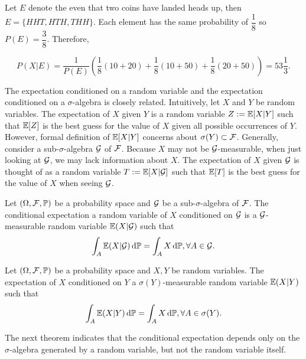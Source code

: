 \begin{solution}
 Let $E$ denote the even that two coins have landed heads up, then $E=\{HHT, HTH, THH\}$. Each element has the same probability of $\dfrac{1}{8}$ so $P(E)=\dfrac{3}{8}$. Therefore,

 $$P(X|E)=\dfrac{1}{P(E)}\left(\dfrac{1}{8}(10+20)+\dfrac{1}{8}(10+50)+\dfrac{1}{8}(20+50)\right)=53\dfrac{1}{3}.$$
\end{solution}

The expectation conditioned on a random variable and the expectation conditioned on a $\sigma$-algebra is closely related. Intuitively, let $X$ and $Y$ be random variables. The expectation of $X$ given $Y$ is a random variable $Z := \mathbb{E}[X|Y]$ such that $\mathbb{E}[Z]$ is the best guess for the value of $X$ given all possible occurrences of $Y$. However, formal definition of $\mathbb{E}[X|Y]$ concerns about $\sigma(Y)\subset\mathcal{F}$. Generally, consider a sub-$\sigma$-algebra $\mathcal{G}$ of $\mathcal{F}$. Because $X$ may not be $\mathcal{G}$-measurable, when just looking at $\mathcal{G}$, we may lack information about $X$. The expectation of $X$ given $\mathcal{G}$ is thought of as a random variable $T:= \mathbb{E}[X|\mathcal{G}]$ such that $\mathbb{E}[T]$ is the best guess for the value of $X$ when seeing $\mathcal{G}$.

\begin{definition}
 Let $(\Omega, \mathcal{F}, \mathbb{P})$ be a probability space and $\mathcal{G}$ be a sub-$\sigma$-algebra of $\mathcal{F}$. The conditional expectation a random variable of $X$ conditioned on $\mathcal{G}$ is a $\mathcal{G}$-measurable random variable $\mathbb{E}(X|\mathcal{G})$ such that
 \begin{equation}
  \int_A \mathbb{E}(X|\mathcal{G})\,\mathrm{d} \mathbb{P}=\int_A X\,\mathrm{d} \mathbb{P}, \forall A\in\mathcal{G}.
 \end{equation}
\end{definition}

\begin{definition}
 Let $(\Omega, \mathcal{F}, \mathbb{P})$ be a probability space and $X,Y$ be random variables. The expectation of $X$ conditioned on $Y$ a $\sigma(Y)$-measurable random variable $\mathbb{E}(X|Y)$ such that
 \begin{equation}
  \int_A \mathbb{E}(X|Y)\,\mathrm{d} \mathbb{P} = \int_A X\,\mathrm{d} \mathbb{P}, \forall A\in\sigma(Y).
 \end{equation}
\end{definition}

The next theorem indicates that the conditional expectation depends only on the $\sigma$-algebra generated by a random variable, but not the random variable itself.


